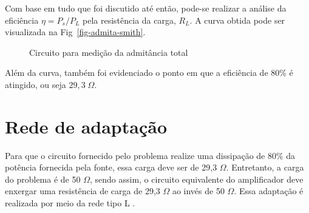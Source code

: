 \documentclass[
  number,
  preprint]{elsarticle}
\begin{document}
Com base em tudo que foi discutido até então, pode-se realizar a análise
da eficiência \(\eta=P_s/P_L\) pela resistência da carga, \(R_L\). A
curva obtida pode ser visualizada na Fig~\ref{fig-admita-smith}.

\begin{figure}


\caption{\label{fig-load-80eff}Circuito para medição da admitância
total}

\end{figure}%

Além da curva, também foi evidenciado o ponto em que a eficiência de
80\% é atingido, ou seja \(29,3\;\Omega\).

\section{Rede de adaptação}\label{rede-de-adaptauxe7uxe3o}

Para que o circuito fornecido pelo problema realize uma dissipação de
80\% da potência fornecida pela fonte, essa carga deve ser de 29,3
\(\Omega\). Entretanto, a carga do problema é de 50 \(\Omega\), sendo
assim, o circuito equivalente do amplificador deve enxergar uma
resistência de carga de 29,3 \(\Omega\) ao invés de 50 \(\Omega\). Essa
adaptação é realizada por meio da rede tipo L
\citep{steer2019microwavev3}.
\end{document}
